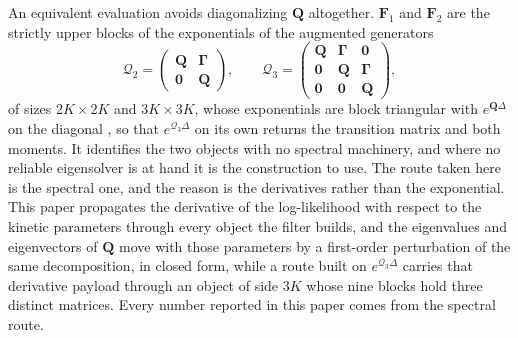 An equivalent evaluation avoids diagonalizing $\mathbf{Q}$ altogether. $\mathbf{F}_1$ and
$\mathbf{F}_2$ are the strictly upper blocks of the exponentials of the augmented generators
\begin{equation}
  \mathcal{Q}_2=\begin{pmatrix}\mathbf{Q} & \bm{\Gamma}\\ \bm{0} & \mathbf{Q}\end{pmatrix},
  \qquad
  \mathcal{Q}_3=\begin{pmatrix}\mathbf{Q} & \bm{\Gamma} & \bm{0}\\
                               \bm{0} & \mathbf{Q} & \bm{\Gamma}\\
                               \bm{0} & \bm{0} & \mathbf{Q}\end{pmatrix},
  \label{eq:augmented}
\end{equation}
of sizes $2K\times 2K$ and $3K\times 3K$, whose exponentials are block triangular with
$e^{\mathbf{Q}\Delta}$ on the diagonal \citep{vanloan1978computing}, so that
$e^{\mathcal{Q}_3\Delta}$ on its own returns the transition matrix and both moments. It
identifies the two objects with no spectral machinery, and where no reliable eigensolver is
at hand it is the construction to use. The route taken here is the spectral one, and the
reason is the derivatives rather than the exponential. This paper propagates the derivative
of the log-likelihood with respect to the kinetic parameters through every object the
filter builds, and the eigenvalues and eigenvectors of $\mathbf{Q}$ move with those
parameters by a first-order perturbation of the same decomposition, in closed form, while a
route built on $e^{\mathcal{Q}_3\Delta}$ carries that derivative payload through an object
of side $3K$ whose nine blocks hold three distinct matrices. Every number reported in this
paper comes from the spectral route.
